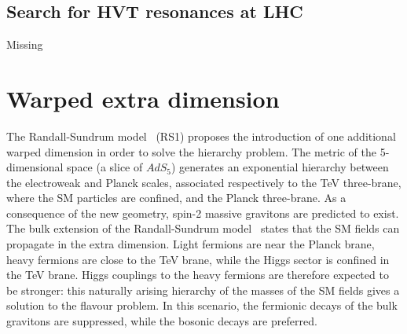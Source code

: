 \subsection{Search for HVT resonances at LHC}
\label{sec:theory_HVT_limits_LHC}
Missing


\newpage
\section{Warped extra dimension}
\label{sec:theory_WED}
The Randall-Sundrum model~\cite{Randall:1999ee,Randall:1999vf} (RS1) proposes the introduction of one additional warped dimension in order to solve the hierarchy problem. The metric of the 5-dimensional space (a slice of $AdS_5$) generates an exponential hierarchy between the electroweak and Planck scales, associated respectively to the TeV three-brane, where the SM particles are confined, and the Planck three-brane. As a consequence of the new geometry, spin-2 massive gravitons are predicted to exist.\\
The bulk extension of the Randall-Sundrum model~\cite{Agashe:2007zd,Fitzpatrick:2007qr} states that the SM fields can propagate in the extra dimension. Light fermions are near the Planck brane, heavy fermions are close to the TeV brane, while the Higgs sector is confined in the TeV brane. Higgs couplings to the heavy fermions are therefore expected to be stronger: this naturally arising hierarchy of the masses of the SM fields gives a solution to the flavour problem. In this scenario, the fermionic decays of the bulk gravitons are suppressed, while the bosonic decays are preferred.


